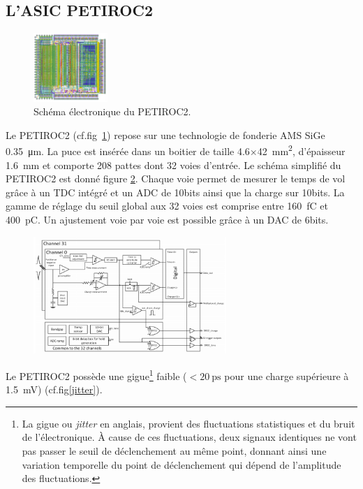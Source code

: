 \subsection{L'ASIC PETIROC2}

\begin{figure}
	\centering
	\vspace*{-1cm}
	\includegraphics[width=0.25\textwidth]{ELE/PETIROC.png}
	\caption{Schéma électronique du PETIROC2.}
	\label{PETIROC2}
\end{figure}

Le PETIROC2 (cf.fig~\ref{PETIROC2}) repose sur une technologie de fonderie AMS SiGe \SI{0.35}{\micro\meter}. La puce est insérée dans un boitier de taille \num{4.6}$\times$\SI{42}{\square\milli\meter}, d'épaisseur \SI{1.6}{\milli\meter} et comporte \num{208} pattes dont \num{32} voies d'entrée. Le schéma simplifié du PETIROC2 est donné figure \ref{SchemePETIROC}. Chaque voie permet de mesurer le temps de vol grâce à un TDC intégré et un ADC de \num{10}bits ainsi que la charge sur \num{10}bits. La gamme de réglage du seuil global aux \num{32} voies est comprise entre \SI{160}{\femto\coulomb} et \SI{400}{\pico\coulomb}. Un ajustement voie par voie est possible grâce à un DAC de \num{6}bits. 

\begin{figure}[ht!]
	\centering
	\includegraphics[width=0.65\textwidth]{ELE/Scheme.png}
	\label{SchemePETIROC}
\end{figure}

Le PETIROC2 possède une gigue\footnote{La gigue ou \textit{jitter} en anglais, provient des fluctuations statistiques et du bruit de l'électronique. À cause de ces fluctuations, deux signaux identiques ne vont pas passer le seuil de déclenchement au même point, donnant ainsi une variation temporelle du point de déclenchement qui dépend de l'amplitude des fluctuations.} faible ($<\SI{20}{\pico\second}$ pour une charge supérieure à \SI{1.5}{\milli\volt}) (cf.fig\ref{jitter}).

